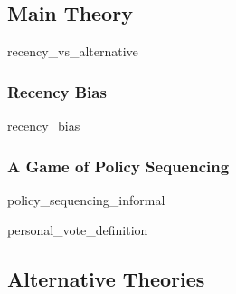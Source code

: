 \documentclass[hyphens, crop=false]{standalone}
\begin{document}
		
			
			
%			
%		
%		
			

		
		
		
		
	\subsection*{Main Theory}
		{recency_vs_alternative}
		
		\subsubsection*{Recency Bias}
			{recency_bias}
		
	
		\subsubsection*{A Game of Policy Sequencing}
			{policy_sequencing_informal}
			
			{personal_vote_definition}
		
%		
		
	\subsection*{Alternative Theories}
		
\end{document}
